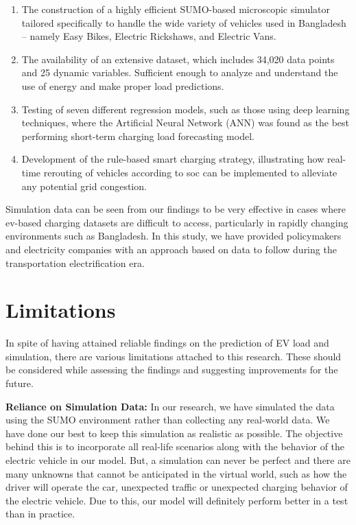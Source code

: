 \documentclass{thesis-library}
\begin{document}
{\begin{enumerate}
  \item The construction of a highly efficient SUMO-based microscopic simulator \cite{sumo2018} tailored specifically to handle the wide variety of vehicles used in Bangladesh – namely Easy Bikes, Electric Rickshaws, and Electric Vans.
  \item The availability of an extensive dataset, which includes 34,020 data points and 25 dynamic variables. Sufficient enough to analyze and understand the use of energy and make proper load predictions.
  \item Testing of seven different regression models, such as those using deep learning techniques, where the Artificial Neural Network (ANN) was found as the best performing short-term charging load forecasting model.
  \item Development of the rule-based smart charging strategy, illustrating how real-time rerouting of vehicles according to \Gls{soc} can be implemented to alleviate any potential grid congestion.
\end{enumerate}

\noindent Simulation data can be seen from our findings to be very effective in cases where \Gls{ev}-based charging datasets are difficult to access, particularly in rapidly changing environments such as Bangladesh. In this study, we have provided policymakers and electricity companies with an approach based on data to follow during the transportation electrification era.

\section{Limitations}

\noindent In spite of having attained reliable findings on the prediction of EV load and simulation, there are various limitations attached to this research. These should be considered while assessing the findings and suggesting improvements for the future.

\vspace{0.5em}
\noindent\textbf{Reliance on Simulation Data:} 
In our research, we have simulated the data
using the SUMO environment rather than collecting any real-world data. We have done our best to keep this simulation as realistic as possible. The objective behind this is to incorporate all
real-life scenarios along with the behavior of the electric vehicle in our model. But, a
simulation can never be perfect and there are many unknowns that cannot be anticipated in the virtual world, such as how the driver will operate the car, unexpected traffic or unexpected
charging behavior of the electric vehicle. Due to this, our model will definitely perform better in a test than in practice.

}
\end{document}
